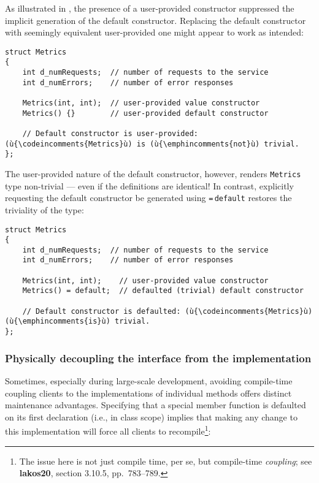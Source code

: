 \noindent As illustrated in , the presence of a user-provided constructor suppressed the implicit generation of the default constructor.  Replacing the default constructor with seemingly equivalent user-provided one might appear to work as intended:

\begin{lstlisting}
struct Metrics
{
    int d_numRequests;  // number of requests to the service
    int d_numErrors;    // number of error responses

    Metrics(int, int);  // user-provided value constructor
    Metrics() {}        // user-provided default constructor

    // Default constructor is user-provided: (ù{\codeincomments{Metrics}ù) is (ù{\emphincomments{not}ù) trivial.
};
\end{lstlisting}

\noindent The user-provided nature of the default constructor, however, renders \lstinline!Metrics! type non-trivial --- even if the definitions are identical!  In contrast, explicitly requesting the default constructor be generated using \lstinline!=!\,\lstinline!default! restores the triviality of the type:

\begin{lstlisting}
struct Metrics
{
    int d_numRequests;  // number of requests to the service
    int d_numErrors;    // number of error responses

    Metrics(int, int);    // user-provided value constructor
    Metrics() = default;  // defaulted (trivial) default constructor

    // Default constructor is defaulted: (ù{\codeincomments{Metrics}ù) (ù{\emphincomments{is}ù) trivial.
};
\end{lstlisting}

\subsubsection[Physically decoupling the interface from the implementation]{Physically decoupling the interface from the implementation}\label{physically-decoupling-the-interface-from-the-implementation}

Sometimes, especially during large-scale development, avoiding compile-time coupling clients to the
implementations of individual methods offers distinct maintenance advantages. Specifying that a special member
function is defaulted on its first declaration (i.e., in class scope)
implies that making any change to this implementation will force all
clients to recompile{\cprotect\footnote{The issue here is not just
compile time, per se, but compile-time \emph{coupling}; see
  \textbf{{lakos20}}, section 3.10.5, pp.~783--789.}}:

